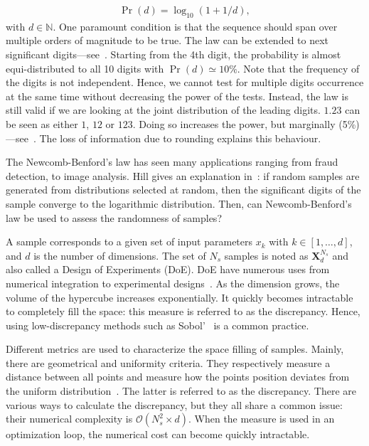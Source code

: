 \documentclass[1p]{elsarticle}
\begin{document}
\begin{align}
	\Pr(d) = \log_{10}(1 + 1/d),
\end{align}
\noindent with $d \in \mathbb{N}$. One paramount condition is that the sequence should span over multiple orders of magnitude to be true. The law can be extended to next significant digits---see~\citep{Hill1995a}. Starting from the 4th digit, the probability is almost equi-distributed to all 10 digits with $\Pr(d) \simeq 10\%$. Note that the frequency of the digits is not independent. Hence, we cannot test for multiple digits occurrence at the same time without decreasing the power of the tests. Instead, the law is still valid if we are looking at the joint distribution of the leading digits. $1.23$ can be seen as either $1$, $12$ or $123$. Doing so increases the power, but marginally (5\%)---see~\citep{Joenssen2013}. The loss of information due to rounding explains this behaviour.

The Newcomb-Benford's law has seen many applications ranging from fraud detection, to image analysis. Hill gives an explanation in~\citep{Hill1995a}: if random samples are generated from distributions selected at random, then the significant digits of the sample converge to the logarithmic distribution. Then, can Newcomb-Benford's law be used to assess the randomness of samples?

A sample corresponds to a given set of input parameters $x_k$ with $k \in [1, \dots , d]$, and $d$ is the number of dimensions. The set of $N_s$ samples is noted as $\mathbf{X}^{N_s}_d$ and also called a Design of Experiments (DoE). DoE have numerous uses from numerical integration to experimental designs~\citep{Sacks1989}. As the dimension grows, the volume of the hypercube increases exponentially. It quickly becomes intractable to completely fill the space: this measure is referred to as the discrepancy. Hence, using low-discrepancy methods such as Sobol'~\citep{Sobol1967} is a common practice.

Different metrics are used to characterize the space filling of samples. Mainly, there are geometrical and uniformity criteria. They respectively measure a distance between all points and measure how the points position deviates from the uniform distribution~\citep{Fang2006,Androulakis2016}. The latter is referred to as the discrepancy. There are various ways to calculate the discrepancy, but they all share a common issue: their numerical complexity is $\mathcal{O}(N_s^2\times d)$. When the measure is used in an optimization loop, the numerical cost can become quickly intractable.
\end{document}
